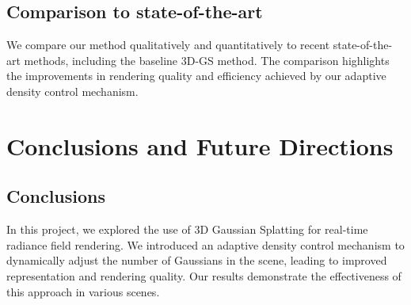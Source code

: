 \documentclass[11pt]{report}
\begin{document}


\section{Comparison to state-of-the-art}
We compare our method qualitatively and quantitatively to recent state-of-the-art methods, including the baseline 3D-GS method. The comparison highlights the improvements in rendering quality and efficiency achieved by our adaptive density control mechanism.


\chapter{Conclusions and Future Directions}

\section{Conclusions}
In this project, we explored the use of 3D Gaussian Splatting for real-time radiance field rendering. We introduced an adaptive density control mechanism to dynamically adjust the number of Gaussians in the scene, leading to improved representation and rendering quality. Our results demonstrate the effectiveness of this approach in various scenes.
\end{document}
